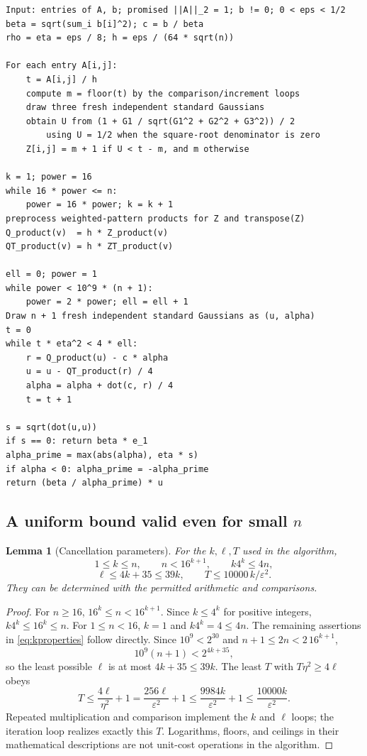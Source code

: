 \documentclass[11pt,a4paper]{article}
\newtheorem{lemma}[theorem]{Lemma}
\theoremstyle{remark}
\newcommand{\eps}{\varepsilon}
\begin{document}
\begin{lstlisting}[caption={Exact-real solver; all loops have deterministic cost bounds.}]
Input: entries of A, b; promised ||A||_2 = 1; b != 0; 0 < eps < 1/2
beta = sqrt(sum_i b[i]^2); c = b / beta
rho = eta = eps / 8; h = eps / (64 * sqrt(n))

For each entry A[i,j]:
    t = A[i,j] / h
    compute m = floor(t) by the comparison/increment loops
    draw three fresh independent standard Gaussians
    obtain U from (1 + G1 / sqrt(G1^2 + G2^2 + G3^2)) / 2
        using U = 1/2 when the square-root denominator is zero
    Z[i,j] = m + 1 if U < t - m, and m otherwise

k = 1; power = 16
while 16 * power <= n:
    power = 16 * power; k = k + 1
preprocess weighted-pattern products for Z and transpose(Z)
Q_product(v)  = h * Z_product(v)
QT_product(v) = h * ZT_product(v)

ell = 0; power = 1
while power < 10^9 * (n + 1):
    power = 2 * power; ell = ell + 1
Draw n + 1 fresh independent standard Gaussians as (u, alpha)
t = 0
while t * eta^2 < 4 * ell:
    r = Q_product(u) - c * alpha
    u = u - QT_product(r) / 4
    alpha = alpha + dot(c, r) / 4
    t = t + 1

s = sqrt(dot(u,u))
if s == 0: return beta * e_1
alpha_prime = max(abs(alpha), eta * s)
if alpha < 0: alpha_prime = -alpha_prime
return (beta / alpha_prime) * u
\end{lstlisting}

\subsection{A uniform bound valid even for small \texorpdfstring{$n$}{n}}

\begin{lemma}[Cancellation parameters]\label{lem:budget}
For the $k,\ell,T$ used in the algorithm,
\begin{equation}\label{eq:kproperties}
 1\le k\le n,\qquad n<16^{k+1},\qquad k4^k\le4n,
\end{equation}
\begin{equation}\label{eq:timeproperties}
 \ell\le4k+35\le39k,\qquad T\le10000\,k/\eps^2.
\end{equation}
They can be determined with the permitted arithmetic and comparisons.
\end{lemma}

\begin{proof}
For $n\ge16$, $16^k\le n<16^{k+1}$. Since $k\le4^k$ for positive integers,
$k4^k\le16^k\le n$. For $1\le n<16$, $k=1$ and $k4^k=4\le4n$.
The remaining assertions in \eqref{eq:kproperties} follow directly.
Since $10^9<2^{30}$ and $n+1\le2n<2\,16^{k+1}$,
\[
 10^9(n+1)<2^{4k+35},
\]
so the least possible $\ell$ is at most $4k+35\le39k$.
The least $T$ with $T\eta^2\ge4\ell$ obeys
\[
 T\le\frac{4\ell}{\eta^2}+1
 =\frac{256\ell}{\eps^2}+1
 \le\frac{9984k}{\eps^2}+1
 \le\frac{10000k}{\eps^2}.
\]
Repeated multiplication and comparison implement the $k$ and $\ell$ loops;
the iteration loop realizes exactly this $T$. Logarithms, floors, and ceilings
in their mathematical descriptions are not unit-cost operations in the
algorithm.
\end{proof}
\end{document}

